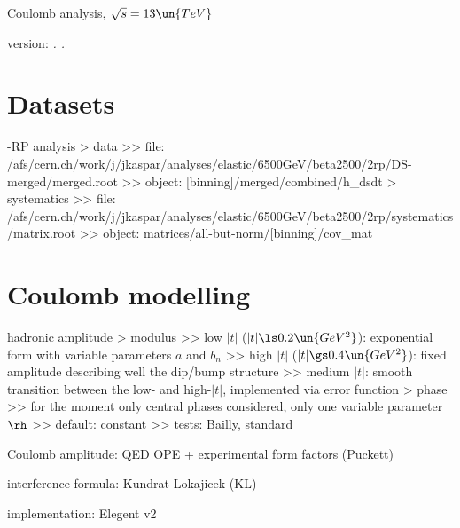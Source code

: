 

\def\baseDir{/afs/cern.ch/work/j/jkaspar/analyses/elastic/6500GeV/combined/coulomb_analysis_1}


\hbox{}
\vskip-10mm

\centerline{\SetFontSizesXX Coulomb analysis, $\sqrt s = 13\un{TeV}$}
\vskip2mm
\centerline{version: {\it \number\day. \number\month. \number\year}}

\vfil
\InsertToc

\vfil
\eject

\BeginText

\chapter[datasets]{Datasets}

-RP analysis
\>> data
\>>> file: /afs/cern.ch/work/j/jkaspar/analyses/elastic/6500GeV/beta2500/2rp/DS-merged/merged.root
\>>> object: [binning]/merged/combined/h\_dsdt
\>> systematics
\>>> file: /afs/cern.ch/work/j/jkaspar/analyses/elastic/6500GeV/beta2500/2rp/systematics/matrix.root
\>>> object: matrices/all-but-norm/[binning]/cov\_mat


\chapter[modelling]{Coulomb modelling}

\> hadronic amplitude
\>> modulus
\>>> low $|t|$ ($|t| \ls 0.2\un{GeV^2}$): exponential form with variable parameters $a$ and $b_n$
\>>> high $|t|$ ($|t| \gs 0.4\un{GeV^2}$): fixed amplitude describing well the dip/bump structure
\>>> medium $|t|$: smooth transition between the low- and high-$|t|$, implemented via error function
\>> phase
\>>> for the moment only central phases considered, only one variable parameter $\rh$
\>>> default: constant
\>>> tests: Bailly, standard

\> Coulomb amplitude: QED OPE + experimental form factors (Puckett)

\> interference formula: Kundrat-Lokajicek (KL)

\> implementation: Elegent v2


